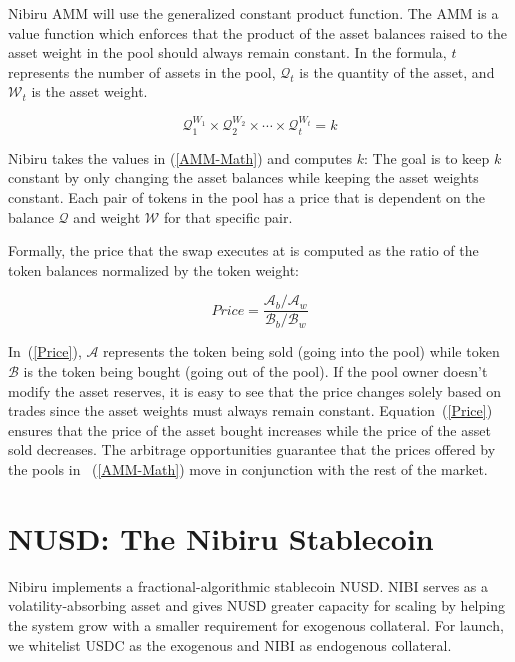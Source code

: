 \documentclass[11pt]{article}
\begin{document}
Nibiru AMM will use the generalized constant product function. The AMM is a value function which enforces that the product of the asset balances raised to the asset weight in the pool should always remain constant. In the formula, $t$ represents the number of assets in the pool, $\mathcal{Q}_t$ is the quantity of the asset, and $\mathcal{W}_t$ is the asset weight. 

\begin{equation}
\mathcal{Q}_1^{W_1} \times \mathcal{Q}_2^{W_2} \times \cdots \times \mathcal{Q}_t^{W_t} = k
\label{AMM-Math}
\end{equation}

Nibiru takes the values in (\ref{AMM-Math}) and computes $k$: The goal is to keep $k$ constant by only changing the asset balances while keeping the asset weights constant. 
Each pair of tokens in the pool has a price that is dependent on the balance $\mathcal{Q}$ and weight $\mathcal{W}$ for that specific pair. 

Formally, the price that the swap executes at is computed as the ratio of the token balances normalized by the token weight:

\begin{equation}
Price = \frac{\mathcal{A}_b/\mathcal{A}_w}{\mathcal{B}_b/\mathcal{B}_w}
\label{Price}
\end{equation}
 
In~(\ref{Price}), $\mathcal{A}$ represents the token being sold (going into the pool) while token $\mathcal{B}$ is the token being bought (going out of the pool). If the pool owner doesn’t modify the asset reserves, it is easy to see that the price changes solely based on trades since the asset weights must always remain constant. Equation~(\ref{Price}) ensures that the price of the asset bought increases while the price of the asset sold decreases. The arbitrage opportunities guarantee that the prices offered by the pools in ~(\ref{AMM-Math}) move in conjunction with the rest of the market.

\part{NUSD: The Nibiru Stablecoin}


Nibiru implements a fractional-algorithmic stablecoin NUSD. NIBI serves as a volatility-absorbing asset and gives NUSD greater capacity for scaling by helping the system grow with a smaller requirement for exogenous collateral. For launch, we whitelist USDC as the exogenous and NIBI as endogenous collateral.
\end{document}
